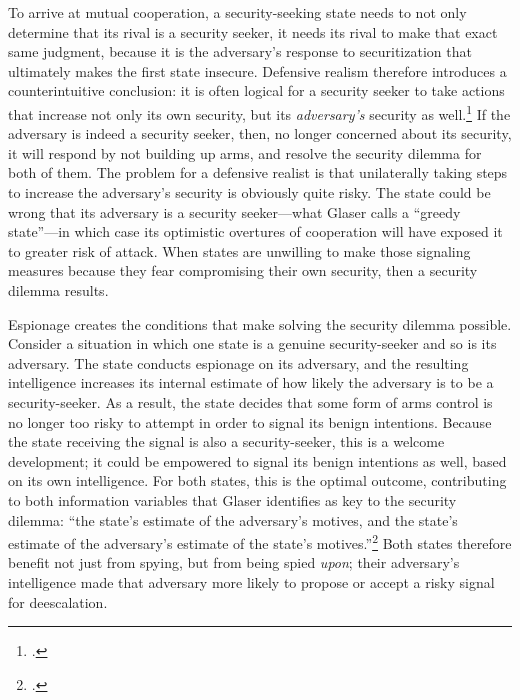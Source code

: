 \documentclass[14pt]{extarticle}
\begin{document}
To arrive at mutual cooperation, a security-seeking state needs to not only determine that its rival is a security seeker, it needs its rival to make that exact same judgment, because it is the adversary's response to securitization that ultimately makes the first state insecure. Defensive realism therefore introduces a counterintuitive conclusion: it is often logical for a security seeker to take actions that increase not only its own security, but its \emph{adversary's} security as well.\footcite[p.~7]{glaser_rational_2010} If the adversary is indeed a security seeker, then, no longer concerned about its security, it will respond by not building up arms, and resolve the security dilemma for both of them. The problem for a defensive realist is that unilaterally taking steps to increase the adversary's security is obviously quite risky. The state could be wrong that its adversary is a security seeker---what Glaser calls a \enquote{greedy state}---in which case its optimistic overtures of cooperation will have exposed it to greater risk of attack. When states are unwilling to make those signaling measures because they fear compromising their own security, then a security dilemma results.

Espionage creates the conditions that make solving the security dilemma possible. Consider a situation in which one state is a genuine security-seeker and so is its adversary. The state conducts espionage on its adversary, and the resulting intelligence increases its internal estimate of how likely the adversary is to be a security-seeker. As a result, the state decides that some form of arms control is no longer too risky to attempt in order to signal its benign intentions. Because the state receiving the signal is also a security-seeker, this is a welcome development; it could be empowered to signal its benign intentions as well, based on its own intelligence. For both states, this is the optimal outcome, contributing to both information variables that Glaser identifies as key to the security dilemma: \enquote{the state’s estimate of the adversary’s motives, and the state’s estimate of the adversary’s estimate of the state’s motives.}\footcite[p.~34-35]{glaser_rational_2010} Both states therefore benefit not just from spying, but from being spied \emph{upon}; their adversary's intelligence made that adversary more likely to propose or accept a risky signal for deescalation.
\end{document}
